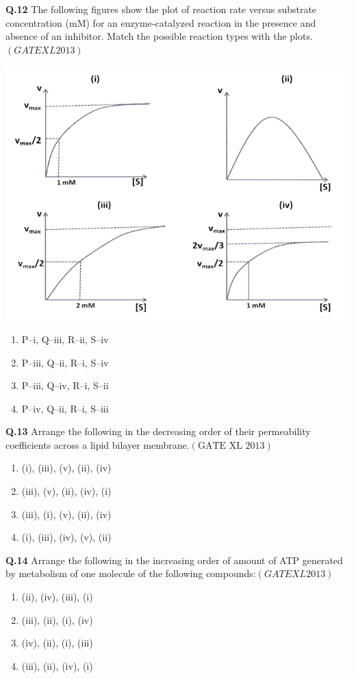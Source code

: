 \documentclass[12pt]{article}
\theoremstyle{remark}
\providecommand{\brak}[1]{\ensuremath{\left(#1\right)}}
\begin{document}
\textbf{Q.12} The following figures show the plot of reaction rate versus substrate concentration (mM) for an enzyme-catalyzed reaction in the presence and absence of an inhibitor. Match the possible reaction types with the plots.\hfill  \textit{\brak{GATE XL 2013}}
\begin{center}
    \includegraphics[width=0.5\columnwidth]{figs/Screenshot 2025-08-05 123225.png}
\end{center}
\begin{enumerate}
    \item P–i, Q–iii, R–ii, S–iv
    \item P–iii, Q–ii, R–i, S–iv
    \item P–iii, Q–iv, R–i, S–ii
    \item P–iv, Q–ii, R–i, S–iii
\end{enumerate}

\textbf{Q.13} Arrange the following in the decreasing order of their permeability coefficients across a lipid bilayer membrane.\hfill $\brak{\text{GATE XL 2013}}$
\begin{enumerate}
    \item (i), (iii), (v), (ii), (iv)
    \item (iii), (v), (ii), (iv), (i)
    \item (iii), (i), (v), (ii), (iv)
    \item (i), (iii), (iv), (v), (ii)
\end{enumerate}

\textbf{Q.14} Arrange the following in the increasing order of amount of ATP generated by metabolism of one molecule of the following compounds:\hfill  \textit{\brak{GATE XL 2013}}
\begin{enumerate}
    \item (ii), (iv), (iii), (i)
    \item (iii), (ii), (i), (iv)
    \item (iv), (ii), (i), (iii)
    \item (iii), (ii), (iv), (i)
\end{enumerate}
\end{document}
